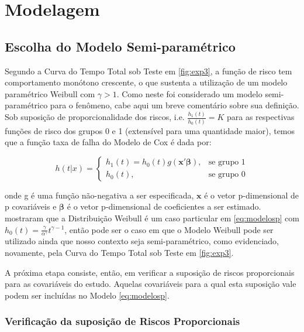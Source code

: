 \documentclass[
	12pt,				%
	openright,			%
	twoside,			%
	a4paper,			%
	english,			%
	brazil				%
	]{abntex2}
\begin{document}
\part{Modelagem}

\chapter{Escolha do Modelo Semi-paramétrico}

Segundo a Curva do Tempo Total sob Teste em \ref{fig:exp3}, a função de risco tem comportamento monótono crescente, o que sustenta a utilização de um modelo paramétrico Weibull com $\gamma > 1$. Como neste foi considerado um modelo semi-paramétrico para o fenômeno, cabe aqui um breve comentário sobre sua definição. Sob suposição de proporcionalidade dos riscos, i.e. $\frac{h_1(t)}{h_0(t)} = K$ para as respectivas funções de risco dos grupos 0 e 1 (extensível para uma quantidade maior), temos que a função taxa de falha do Modelo de Cox é dada por:

\begin{equation}
\label{eq:modelosp}
h(t|x) = \begin{cases}
h_1(t) = h_0(t)g(\boldsymbol{x'}\boldsymbol{\beta}), & \mbox{se grupo 1} \\
h_0(t), & \mbox{se grupo 0}
\end{cases}
\end{equation}

onde g é uma função não-negativa a ser especificada, $\boldsymbol{x}$ é o vetor p-dimensional de p covariáveis e $\boldsymbol{\beta}$ é o vetor p-dimensional de coeficientes a ser estimado. \cite{kalbfleisch2011statistical} mostraram que a Distribuição Weibull é um caso particular em \ref{eq:modelosp} com $h_0(t) = \frac{\gamma}{\alpha^{\gamma}}t^{\gamma-1}$, então pode ser o caso em que o Modelo Weibull pode ser utilizado ainda que nosso contexto seja semi-paramétrico, como evidenciado, novamente, pela Curva do Tempo Total sob Teste em \ref{fig:exp3}.

A próxima etapa consiste, então, em verificar a suposição de riscos proporcionais para as covariáveis do estudo. Aquelas covariáveis para a qual esta suposição vale podem ser incluídas no Modelo \ref{eq:modelosp}.

\section{Verificação da suposição de Riscos Proporcionais}
\end{document}
